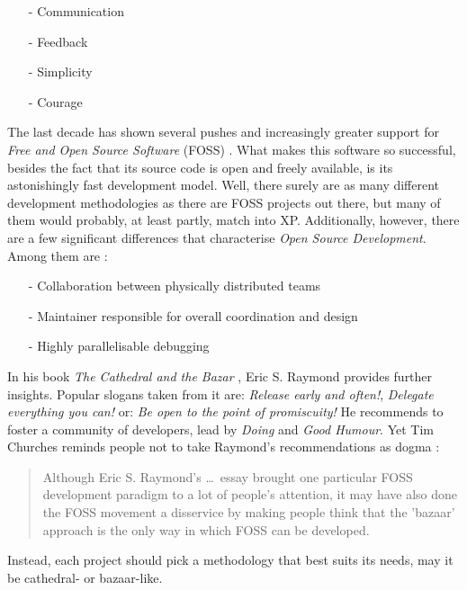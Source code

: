 \begin{itemize}
    \item[-] Communication
    \item[-] Feedback
    \item[-] Simplicity
    \item[-] Courage
\end{itemize}

The last decade has shown several pushes and increasingly greater support for
\emph{Free and Open Source Software} (FOSS) \cite{opensource}. What makes this
software so successful, besides the fact that its source code is open and
freely available, is its astonishingly fast development model. Well, there
surely are as many different development methodologies as there are FOSS
projects out there, but many of them would probably, at least partly,
match into XP. Additionally, however, there are a few significant differences
that characterise \emph{Open Source Development}. Among them are
\cite{fowlernewmethodology}:

\begin{itemize}
    \item[-] Collaboration between physically distributed teams
    \item[-] Maintainer responsible for overall coordination and design
    \item[-] Highly parallelisable debugging
\end{itemize}

In his book \emph{The Cathedral and the Bazar} \cite{raymond}, Eric S. Raymond
provides further insights. Popular slogans taken from it are: \textit{Release
early and often!}, \textit{Delegate everything you can!} or: \textit{Be open to
the point of promiscuity!} He recommends to foster a community of developers,
lead by \emph{Doing} and \emph{Good Humour}. Yet Tim Churches reminds people not
to take Raymond's recommendations as dogma \cite{openhealth}:

\begin{quote}
    Although Eric S. Raymond's \ldots\ essay brought one particular FOSS
    development paradigm to a lot of people's attention, it may have also done
    the FOSS movement a disservice by making people think that the 'bazaar'
    approach is the only way in which FOSS can be developed.
\end{quote}

Instead, each project should pick a methodology that best suits its needs, may
it be cathedral- or bazaar-like.

